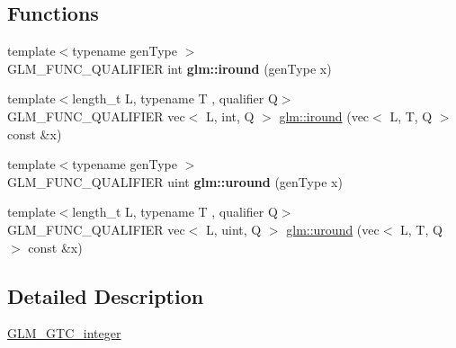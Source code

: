 \subsection*{Functions}
\begin{DoxyCompactItemize}
\item 
\mbox{\label{gtc_2integer_8inl_ac64c94481641999914b9eab162db3a0f}} 
{\footnotesize template$<$typename gen\+Type $>$ }\\G\+L\+M\+\_\+\+F\+U\+N\+C\+\_\+\+Q\+U\+A\+L\+I\+F\+I\+ER int {\bfseries glm\+::iround} (gen\+Type x)
\item 
{\footnotesize template$<$length\+\_\+t L, typename T , qualifier Q$>$ }\\G\+L\+M\+\_\+\+F\+U\+N\+C\+\_\+\+Q\+U\+A\+L\+I\+F\+I\+ER vec$<$ L, int, Q $>$ \hyperlink{group__gtc__integer_ga57824268ebe13a922f1d69a5d37f637f}{glm\+::iround} (vec$<$ L, T, Q $>$ const \&x)
\item 
\mbox{\label{gtc_2integer_8inl_a2929f3403ed935b4537cb5e5b51219ee}} 
{\footnotesize template$<$typename gen\+Type $>$ }\\G\+L\+M\+\_\+\+F\+U\+N\+C\+\_\+\+Q\+U\+A\+L\+I\+F\+I\+ER uint {\bfseries glm\+::uround} (gen\+Type x)
\item 
{\footnotesize template$<$length\+\_\+t L, typename T , qualifier Q$>$ }\\G\+L\+M\+\_\+\+F\+U\+N\+C\+\_\+\+Q\+U\+A\+L\+I\+F\+I\+ER vec$<$ L, uint, Q $>$ \hyperlink{group__gtc__integer_ga6715b9d573972a0f7763d30d45bcaec4}{glm\+::uround} (vec$<$ L, T, Q $>$ const \&x)
\end{DoxyCompactItemize}


\subsection{Detailed Description}
\hyperlink{group__gtc__integer}{G\+L\+M\+\_\+\+G\+T\+C\+\_\+integer} 